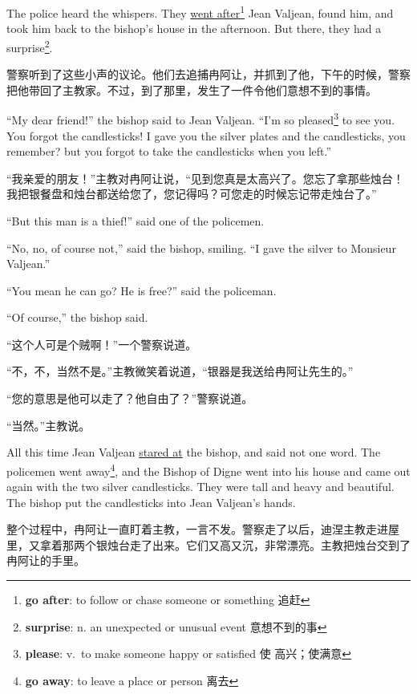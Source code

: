 \documentclass[fontset=ubuntu, zihao=5]{ctexart}
\begin{document}
\begin{paracol}{2}
  \switchcolumn*

  The police heard the whispers. They \uline{went after}\footnote{\textbf{go
      after}: to follow or chase someone or something 追赶} Jean Valjean,
  found him, and took him back to the bishop's house in the afternoon. But
  there, they had a surprise\footnote{\textbf{surprise}: n. an unexpected or
    unusual event 意想不到的事}.

  \switchcolumn
  警察听到了这些小声的议论。他们去追捕冉阿让，并抓到了他，下午的时候，警察把他带回了主教家。不过，到了那里，发生了一件令他们意想不到的事情。

  \switchcolumn*

  ``My dear friend!'' the bishop said to Jean Valjean. ``I'm so
  pleased\footnote{\textbf{please}: v. to make someone happy or satisfied 使
    高兴；使满意} to see you. You forgot the candlesticks! I gave you the
  silver plates and the candlesticks, you remember? but you forgot to take
  the candlesticks when you left.''

  \switchcolumn
  “我亲爱的朋友！”主教对冉阿让说，“见到您真是太高兴了。您忘了拿那些烛台！我把银餐盘和烛台都送给您了，您记得吗？可您走的时候忘记带走烛台了。”

  \switchcolumn*

  ``But this man is a thief!'' said one of the policemen.

  ``No, no, of course not,'' said the bishop, smiling. ``I gave the silver to Monsieur Valjean.''

  ``You mean he can go? He is free?'' said the policeman.

  ``Of course,'' the bishop said.

  \switchcolumn

  “这个人可是个贼啊！”一个警察说道。

  “不，不，当然不是。”主教微笑着说道，“银器是我送给冉阿让先生的。”

  “您的意思是他可以走了？他自由了？”警察说道。

  “当然。”主教说。

  \switchcolumn*

  All this time Jean Valjean \uline{stared at} the bishop, and said not one word. The policemen went away\footnote{\textbf{go away}: to leave a place or person 离去}, and the Bishop of Digne went into his house and came out again with the two silver candlesticks. They were tall and heavy and beautiful. The bishop put the candlesticks into Jean Valjean's hands.

  \switchcolumn
  整个过程中，冉阿让一直盯着主教，一言不发。警察走了以后，迪涅主教走进屋里，又拿着那两个银烛台走了出来。它们又高又沉，非常漂亮。主教把烛台交到了冉阿让的手里。


\end{paracol}
\end{document}
